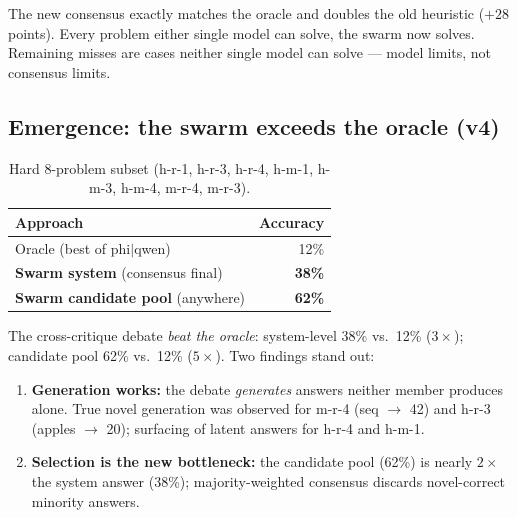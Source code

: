 \documentclass[10pt,twocolumn]{article}
\begin{document}
The new consensus exactly matches the oracle and doubles the old heuristic
($+28$ points). Every problem either single model can solve, the swarm now
solves. Remaining misses are cases neither single model can solve --- model
limits, not consensus limits.

\subsection{Emergence: the swarm exceeds the oracle (v4)}
\begin{table}[t]
  \centering
  \small
  \caption{Hard 8-problem subset (h-r-1, h-r-3, h-r-4, h-m-1, h-m-3, h-m-4,
  m-r-4, m-r-3).}
  \label{tab:emergence}
  \begin{tabular}{@{}lr@{}}
    \toprule
    Approach & Accuracy \\
    \midrule
    Oracle (best of phi$|$qwen) & 12\% \\
    \textbf{Swarm system} (consensus final) & \textbf{38\%} \\
    \textbf{Swarm candidate pool} (anywhere) & \textbf{62\%} \\
    \bottomrule
  \end{tabular}
\end{table}

The cross-critique debate \emph{beat the oracle}: system-level 38\% vs.\ 12\%
($3\times$); candidate pool 62\% vs.\ 12\% ($5\times$). Two findings stand out:
\begin{enumerate}
  \item \textbf{Generation works:} the debate \emph{generates} answers neither
        member produces alone. True novel generation was observed for m-r-4
        (seq $\rightarrow$ 42) and h-r-3 (apples $\rightarrow$ 20); surfacing
        of latent answers for h-r-4 and h-m-1.
  \item \textbf{Selection is the new bottleneck:} the candidate pool (62\%) is
        nearly $2\times$ the system answer (38\%); majority-weighted consensus
        discards novel-correct minority answers.
\end{enumerate}
\end{document}
